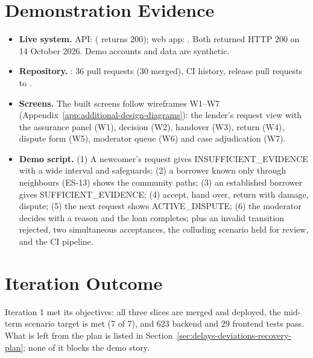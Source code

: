 \section{Demonstration Evidence}\label{sec:demonstration-evidence}
\begin{itemize}
\item \textbf{Live system.} API:  ( returns 200); web app: . Both returned HTTP 200 on 14 October 2026. Demo accounts and data are synthetic.
\item \textbf{Repository.} : 36 pull requests (30 merged), CI history, release pull requests to .
\item \textbf{Screens.} The built screens follow wireframes W1--W7 (Appendix~\ref{app:additional-design-diagrams}): the lender's request view with the assurance panel (W1), decision (W2), handover (W3), return (W4), dispute form (W5), moderator queue (W6) and case adjudication (W7).
\item \textbf{Demo script.} (1) A newcomer's request gives INSUFFICIENT\_EVIDENCE with a wide interval and safeguards; (2) a borrower known only through neighbours (ES-13) shows the community paths; (3) an established borrower gives SUFFICIENT\_EVIDENCE; (4) accept, hand over, return with damage, dispute; (5) the next request shows ACTIVE\_DISPUTE; (6) the moderator decides with a reason and the loan completes; plus an invalid transition rejected, two simultaneous acceptances, the colluding scenario held for review, and the CI pipeline.
\end{itemize}

\section{Iteration Outcome}\label{sec:iteration-outcome}
Iteration 1 met its objectives: all three slices are merged and deployed, the mid-term scenario target is met (7 of 7), and 623 backend and 29 frontend tests pass. What is left from the plan is listed in Section~\ref{sec:delays-deviations-recovery-plan}; none of it blocks the demo story.
